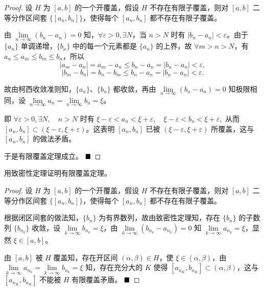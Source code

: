 \begin{proof}
    设 $H$ 为 $[a, b]$ 的一个开覆盖，假设 $H$ 不存在有限子覆盖，则对 $[a, b]$ 二等分作区间套 $\{[a_n, b_n]\}$，使得每个 $[a_n, b_n]$ 都不存在有限子覆盖。
   
    由 \(\lim\limits_{n \to \infty} (b_n - a_n) = 0\) 知，\(\forall \varepsilon > 0, \exists N\)，当 \(n > N\) 时有 \(|b_n - a_n| < \varepsilon\)。由于 \(\{a_n\}\) 单调递增，\(\{b_n\}\) 中的每一个元素都是 \(\{a_n\}\) 的上界，故 \(\forall m > n > N\)，有 \(a_n \leq a_m \leq b_m \leq b_n\)，所以
    \[
    |a_m - a_n| = a_m - a_n \leq b_n - a_n = |b_n - a_n| < \varepsilon,
    \]
    \[
    |b_m - b_n| = b_n - b_m \leq b_n - a_n = |b_n - a_n| < \varepsilon.
    \]
    
    故由柯西收敛准则知，\(\{a_n\}\)、\(\{b_n\}\) 都收敛，再由 \(\lim\limits_{n \to \infty} (b_n - a_n) = 0\) 知极限相同，设 \(\lim\limits_{n \to \infty} a_n = \lim\limits_{n \to \infty} b_n = \xi\)。
    
    即
    $
    \forall \varepsilon > 0, \exists N, \quad n > N
    $
    时有
    $
    \xi - \varepsilon < a_n < \xi + \varepsilon, \quad \xi - \varepsilon < b_n < \xi + \varepsilon,
    $
    从而 $[a_n, b_n] \subset (\xi - \varepsilon, \xi + \varepsilon)$。这表明 $[a_n, b_n]$ 已被 $(\xi - \varepsilon, \xi + \varepsilon)$ 所覆盖，这与 $[a_n, b_n]$ 的做法矛盾。
    
    于是有限覆盖定理成立。
    $\hfill \blacksquare$
\end{proof}

\begin{problem}
    用致密性定理证明有限覆盖定理。
\end{problem}

\begin{proof}
    设 $H$ 为 $[a,b]$ 的一个开覆盖，假设 $H$ 不存在有限子覆盖，则对 $[a,b]$ 二等分作区间套 $\{[a_n, b_n]\}$，使得每个 $[a_n, b_n]$ 都不存在有限子覆盖。
    
    根据闭区间套的做法知，$\{b_n\}$ 为有界数列，故由致密性定理知，存在 $\{b_n\}$ 的子数列 $\{b_{n_k}\}$ 收敛，设 $\lim\limits_{k \to \infty} b_{n_k} = \xi$，由 $\lim\limits_{k \to \infty} (b_{n_k} - a_{n_k}) = 0$ 知 $\lim\limits_{k \to \infty} a_{n_k} = \xi$，显然 $\xi \in [a,b]$。
    
    由 $[a,b]$ 被 $H$ 覆盖知，存在开区间 $(\alpha,\beta) \in H$，使 $\xi \in (\alpha,\beta)$，由 $\lim\limits_{k \to \infty} a_{n_k} = \lim\limits_{k \to \infty} b_{n_k} = \xi$ 知，存在充分大的 $K$ 使得 $[a_{n_K}, b_{n_K}] \subset (\alpha,\beta)$，这与 $[a_{n_K}, b_{n_K}]$ 不能被 $H$ 有限覆盖矛盾。
    $\hfill \blacksquare$
\end{proof}


